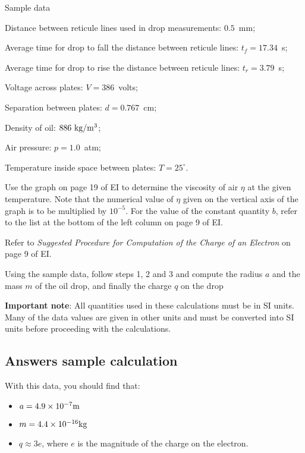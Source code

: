 Sample data
\begin{itemize*}
\item Distance between reticule lines used in drop measurements: $0.5$~mm;
\item Average time for drop to fall the distance between reticule lines: $t_f =
  17.34$~s; 
\item Average time for drop to rise the distance between reticule lines: $t_r =
  3.79$~s; 
\item Voltage across plates: $V = 386$~volts;
\item Separation between plates: $d = 0.767$~cm;
\item Density of oil: $886~{\rm kg}/{\rm m}^3$;
\item Air pressure: $p=1.0$~atm;
\item Temperature inside space between plates: $T= 25^\circ$.
\end{itemize*}

Use the graph on page 19 of EI to determine the viscosity of air $\eta$ at
the given temperature.  Note that the numerical value of
$\eta$ given on the vertical axis of the graph is
to be multiplied by $10^{-5}$.  For
the value of the constant quantity $b$, refer to the list at the bottom
of the left column on page 9 of EI.

Refer to {\em Suggested Procedure for Computation of
the Charge of an Electron} on page 9 of EI.

Using the sample data, follow steps 1, 2 and 3 and compute the radius $a$
and the mass $m$ of the oil drop, and finally the charge $q$ on the drop

{\bf Important note}: All quantities used in these
calculations must be in SI units. Many of the data values are given in
other units and must be converted into SI units before proceeding with
the calculations.

\subsection{Answers sample calculation}

With this data, you should find that:
\begin{itemize}
\item $a = 4.9 \times 10^{-7} {\rm m}$

\item $m = 4.4 \times 10^{-16} {\rm kg}$

\item $q \approx 3e$, where $e$ is the magnitude of
the charge on the electron.
\end{itemize}


